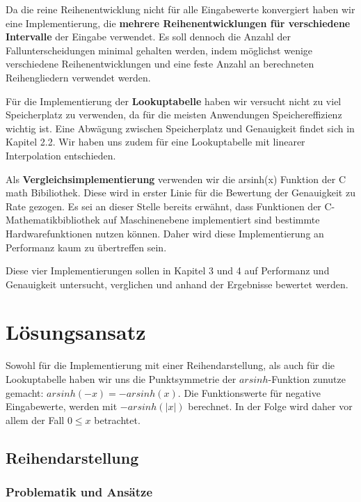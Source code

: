 \documentclass[course=erap] {aspdoc}
\begin{document}
     Da die reine Reihenentwicklung nicht für alle Eingabewerte konvergiert haben wir eine Implementierung, die \textbf{mehrere Reihenentwicklungen für verschiedene Intervalle} der Eingabe verwendet. Es soll dennoch die Anzahl der Fallunterscheidungen minimal gehalten werden, indem  möglichst wenige verschiedene Reihenentwicklungen und eine feste Anzahl an berechneten Reihengliedern verwendet werden.
 
     Für die Implementierung der \textbf{Lookuptabelle} haben wir versucht nicht zu viel Speicherplatz zu verwenden, da für die meisten Anwendungen Speichereffizienz wichtig ist. Eine Abwägung zwischen Speicherplatz und Genauigkeit findet sich in Kapitel 2.2. Wir haben uns zudem für eine Lookuptabelle mit linearer Interpolation entschieden.
 
     Als \textbf{Vergleichsimplementierung} verwenden wir die arsinh(x) Funktion der C math Bibiliothek. Diese wird in erster Linie für die Bewertung der Genauigkeit zu Rate gezogen. Es sei an dieser Stelle bereits erwähnt, dass Funktionen der C-Mathematikbibliothek auf Maschinenebene implementiert sind bestimmte Hardwarefunktionen nutzen können. Daher wird diese Implementierung an Performanz kaum zu übertreffen sein.
 
     Diese vier Implementierungen sollen in Kapitel 3 und 4 auf Performanz und Genauigkeit untersucht, verglichen und anhand der Ergebnisse bewertet werden.
     
 
 
     \section{Lösungsansatz}
 
     Sowohl für die Implementierung mit einer Reihendarstellung, als auch für die Lookuptabelle haben wir uns die Punktsymmetrie der $arsinh$-Funktion zunutze gemacht: $arsinh(-x) = -arsinh(x)$. Die Funktionswerte für negative Eingabewerte, werden mit $-arsinh(|x|)$ berechnet. In der Folge wird daher vor allem der Fall $0\leq x$ betrachtet.

     \subsection{ Reihendarstellung}
     \subsubsection{Problematik und Ansätze}
\end{document}
